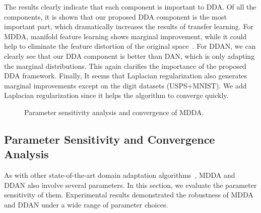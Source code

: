 \documentclass[acmsmall]{acmart}
\begin{document}
The results clearly indicate that each component is important to DDA. Of all the components, it is shown that our proposed DDA component is the most important part, which dramatically increases the results of transfer learning. For MDDA, manifold feature learning shows marginal improvement, while it could help to eliminate the feature distortion of the original space~\cite{baktashmotlagh2013unsupervised}. For DDAN, we can clearly see that our DDA component is better than DAN, which is only adapting the marginal distributions. This again clarifies the importance of the proposed DDA framework. Finally, It seems that Laplacian regularization also generates marginal improvements except on the digit datasets (USPS+MNIST). We add Laplacian regularization since it helps the algorithm to converge quickly.





\begin{figure*}[t!]
	\centering
{}
	\hspace{-.1in}
	\hspace{-.1in}
	\hspace{-.1in}
	\hspace{-.1in}
	\hspace{-.1in}
	\vspace{-.2in}
	\caption{Parameter sensitivity analysis and convergence of MDDA.}
	\label{fig-p-d}

\end{figure*}








\subsection{Parameter Sensitivity and Convergence Analysis}
\label{sec-para}

As with other state-of-the-art domain adaptation algorithms~\cite{zhang2017joint,long2014adaptation,ghifary2017scatter}, MDDA and DDAN also involve several parameters. In this section, we evaluate the parameter sensitivity of them. Experimental results demonstrated the robustness of MDDA and DDAN under a wide range of parameter choices.
\end{document}
